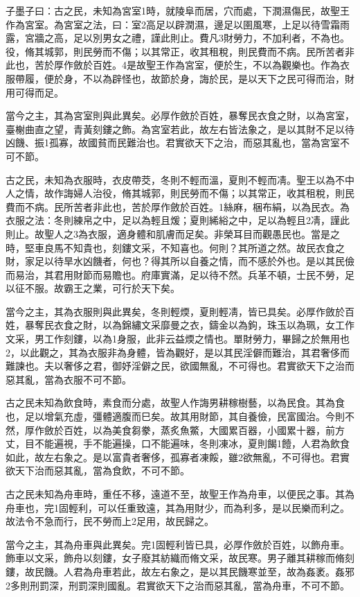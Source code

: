 
\begin{pinyinscope}
子墨子曰：古之民，未知為宮室1時，就陵阜而居，穴而處，下潤濕傷民，故聖王作為宮室。為宮室之法，曰：室2高足以辟潤濕，邊足以圉風寒，上足以待雪霜雨露，宮牆之高，足以別男女之禮，謹此則止。費凡3財勞力，不加利者，不為也。役，脩其城郭，則民勞而不傷；以其常正，收其租稅，則民費而不病。民所苦者非此也，苦於厚作斂於百姓。4是故聖王作為宮室，便於生，不以為觀樂也。作為衣服帶履，便於身，不以為辟怪也，故節於身，誨於民，是以天下之民可得而治，財用可得而足。

當今之主，其為宮室則與此異矣。必厚作斂於百姓，暴奪民衣食之財，以為宮室，臺榭曲直之望，青黃刻鏤之飾。為宮室若此，故左右皆法象之，是以其財不足以待凶饑、振1孤寡，故國貧而民難治也。君實欲天下之治，而惡其亂也，當為宮室不可不節。

古之民，未知為衣服時，衣皮帶茭，冬則不輕而溫，夏則不輕而凊。聖王以為不中人之情，故作誨婦人治役，脩其城郭，則民勞而不傷；以其常正，收其租稅，則民費而不病。民所苦者非此也，苦於厚作斂於百姓。1絲麻，梱布絹，以為民衣。為衣服之法：冬則練帛之中，足以為輕且煖；夏則絺綌之中，足以為輕且2凊，謹此則止。故聖人之3為衣服，適身體和肌膚而足矣。非榮耳目而觀愚民也。當是之時，堅車良馬不知貴也，刻鏤文采，不知喜也。何則？其所道之然。故民衣食之財，家足以待旱水凶饑者，何也？得其所以自養之情，而不感於外也。是以其民儉而易治，其君用財節而易贍也。府庫實滿，足以待不然。兵革不頓，士民不勞，足以征不服。故霸王之業，可行於天下矣。

當今之主，其為衣服則與此異矣，冬則輕煗，夏則輕凊，皆已具矣。必厚作斂於百姓，暴奪民衣食之財，以為錦繡文采靡曼之衣，鑄金以為鉤，珠玉以為珮，女工作文采，男工作刻鏤，以為1身服，此非云益煗之情也。單財勞力，畢歸之於無用也2，以此觀之，其為衣服非為身體，皆為觀好，是以其民淫僻而難治，其君奢侈而難諫也。夫以奢侈之君，御妤淫僻之民，欲國無亂，不可得也。君實欲天下之治而惡其亂，當為衣服不可不節。

古之民未知為飲食時，素食而分處，故聖人作誨男耕稼樹藝，以為民食。其為食也，足以增氣充虛，彊體適腹而巳矣。故其用財節，其自養儉，民富國治。今則不然，厚作斂於百姓，以為美食芻豢，蒸炙魚鱉，大國累百器，小國累十器，前方丈，目不能遍視，手不能遍操，口不能遍味，冬則凍冰，夏則餲1饐，人君為飲食如此，故左右象之。是以富貴者奢侈，孤寡者凍餒，雖2欲無亂，不可得也。君實欲天下治而惡其亂，當為食飲，不可不節。

古之民未知為舟車時，重任不移，遠道不至，故聖王作為舟車，以便民之事。其為舟車也，完1固輕利，可以任重致遠，其為用財少，而為利多，是以民樂而利之。故法令不急而行，民不勞而上2足用，故民歸之。

當今之主，其為舟車與此異矣。完1固輕利皆已具，必厚作斂於百姓，以飾舟車。飾車以文采，飾舟以刻鏤，女子廢其紡織而脩文采，故民寒。男子離其耕稼而脩刻鏤，故民饑。人君為舟車若此，故左右象之，是以其民饑寒並至，故為姦袤。姦邪2多則刑罰深，刑罰深則國亂。君實欲天下之治而惡其亂，當為舟車，不可不節。


\end{pinyinscope}
